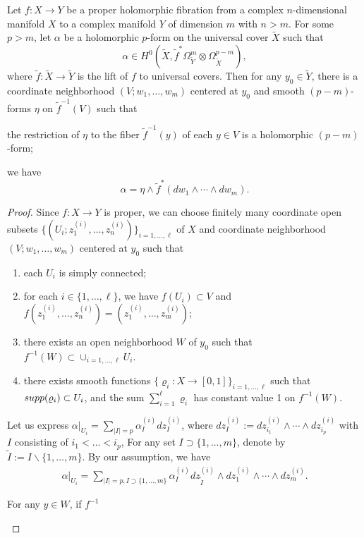 \documentclass[10pt,a4paper]{amsart}
\begin{document}
	\begin{lemma}
		Let $f:X\to Y$ be a proper holomorphic fibration from a complex $n$-dimensional manifold $X$  to a complex manifold $Y$ of dimension $m$ with $n>m$. For some $p>m$, let $\alpha$ be a holomorphic $p$-form on the universal cover $\widetilde{X}$ such that $$\alpha\in H^0(\widetilde{X},\tilde{f}^*\Omega_{\widetilde{Y}}^m\otimes \Omega_{\widetilde{X}}^{p-m}),$$
		where $\tilde{f}:\widetilde{X}\to\widetilde{Y}$ is the lift of $f$ to   universal covers.  Then for any $y_0\in \widetilde{Y}$, there is a coordinate neighborhood $(V;w_1,\ldots,w_m)$ centered at $y_0$ and smooth $(p-m)$-forms $\eta$ on $\tilde{f}^{-1}(V)$  such that
		\begin{thmlist}
			\item the restriction of $\eta$ to the fiber $\tilde{f}^{-1}(y)$  of each $y\in V$ is  a holomorphic $(p-m)$-form;
			\item we have
			$$\alpha=\eta\wedge \tilde{f}^*(dw_1\wedge \cdots\wedge dw_m).$$
		\end{thmlist}
	\end{lemma}

	\begin{proof}
		Since $f:X\to Y$ is proper, we can choose finitely many coordinate open subsets $\{(U_i;z^{(i)}_1,\ldots,z^{(i)}_n)\}_{i=1,\ldots,\ell}$ of $X$ and coordinate neighborhood $(V;w_1,\ldots,w_m)$ centered at $y_0$ such that 
		\begin{enumerate}
			\item each $U_i$ is simply connected;
			\item for each $i\in \{1,\ldots,\ell\}$, we have $f(U_i)\subset V$  and
			$f(z^{(i)}_1,\ldots,z^{(i)}_n)=(z^{(i)}_1,\ldots,z^{(i)}_m)$;
			\item there exists an open neighborhood $W$ of $y_0$ such that $f^{-1}(W)\subset \cup_{i=1,\ldots,\ell}U_i$.    
		\item there exists smooth functions $\{\varrho_i:X\to [0,1]\}_{i=1,\ldots,\ell}$ such that ${\rm supp}(\varrho_i)\subset U_i$, and  the sum $\sum_{i=1}^{\ell}\varrho_i$ has constant value 1 on $f^{-1}(W)$.
		\end{enumerate}
Let us express  
	$\alpha|_{U_i}=\sum_{|I|=p}\alpha^{(i)}_I dz^{(i)}_I$, where $dz^{(i)}_I:=  dz^{(i)}_{i_1}\wedge \cdots \wedge dz^{(i)}_{i_p}$ with  $I$  consisting of $i_1<\ldots<i_p$, 	 
	 For any set $I\supset\{1,\ldots,m\}$,  denote by $\tilde{I}:=I\backslash\{1,\ldots,m\}$.   By our assumption, we have
	\begin{align} 
		\alpha|_{U_i}=\sum_{|I|=p,I\supset\{1,\ldots,m\}}\alpha^{(i)}_Idz^{(i)}_{\tilde{I}}\wedge dz^{(i)}_1\wedge \cdots\wedge dz^{(i)}_m.
	\end{align} 
\begin{claim}
	For any $y\in W$, if $f^{-1}$
\end{claim}
		
		
			\end{proof}
\end{document}
